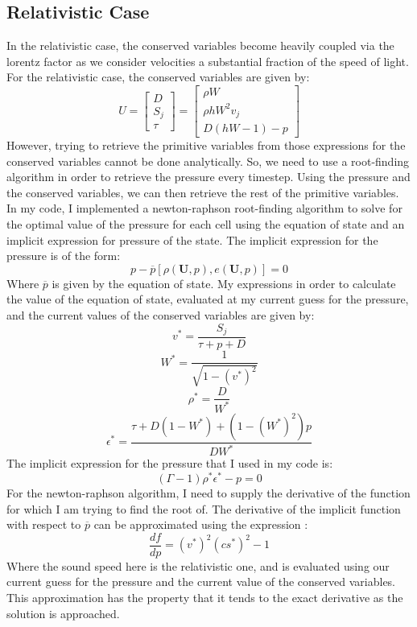 \subsection{Relativistic Case}
In the relativistic case, the conserved variables become heavily coupled via the lorentz factor as we consider velocities a substantial fraction of the speed of light. For the relativistic case, the conserved variables are given by:
$$U=\begin{bmatrix}D \\ S_j \\ \tau \end{bmatrix} = \begin{bmatrix}\rho W \\ \rho h W^2 v_j \\ D(hW-1)-p \end{bmatrix}$$
However, trying to retrieve the primitive variables from those expressions for the conserved variables cannot be done analytically. So, we need to use a root-finding algorithm in order to retrieve the pressure every timestep. Using the pressure and the conserved variables, we can then retrieve the rest of the primitive variables. \\
In my code, I implemented a newton-raphson root-finding algorithm to solve for the optimal value of the pressure for each cell using the equation of state and an implicit expression for pressure of the state. The implicit expression for the pressure is of the form:
$$p-\overline{p}[\rho(\bm{U},p),e(\bm{U},p)]=0$$
Where $\overline{p}$ is given by the equation of state. My expressions in order to calculate the value of the equation of state, evaluated at my current guess for the pressure, and the current values of the conserved variables are given by:
$$v^{*}=\frac{S_j}{\tau+p+D}$$
$$W^{*}=\frac{1}{\sqrt{1-(v^{*})^2}}$$
$$\rho^{*}=\frac{D}{W^{*}}$$
$$\epsilon^{*}=\frac{\tau +D(1-W^{*})+(1-(W^{*})^2)p}{DW^{*}}$$
The implicit expression for the pressure that I used in my code is:
$$(\Gamma-1)\rho^{*}\epsilon^{*}-p=0$$
For the newton-raphson algorithm, I need to supply the derivative of the function for which I am trying to find the root of. The derivative of the implicit function with respect to $\overline{p}$ can be approximated using the expression \cite{marti}:
$$\frac{df}{dp}=(v^{*})^2(cs^{*})^2-1$$
Where the sound speed here is the relativistic one, and is evaluated using our current guess for the pressure and the current value of the conserved variables. This approximation has the property that it tends to the exact derivative as the solution is approached.\\
